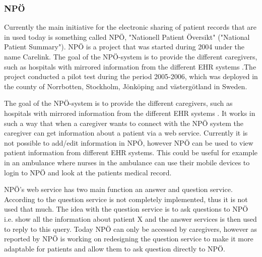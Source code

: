 \documentclass[14pt]{article}
\begin{document}
\subsubsection{NPÖ} %
Currently the main initiative for the electronic sharing of patient records that are in used today is something called NPÖ, "Nationell Patient Översikt" ("National Patient Summary"). NPÖ is a project that was started during 2004 under the name Carelink\cite{ViktorJernelov}. The goal of the NPÖ-system is to provide the different caregivers, such as hospitals with mirrored information from the different \gls{EHR} systems \cite{ViktorJernelov}.The project conducted a pilot test during the period 2005-2006, which was deployed in the county of Norrbotten, Stockholm, Jönköping and västergötland in Sweden.

The goal of the NPÖ-system is to provide the different caregivers, such as hospitals with mirrored information from the different \gls{EHR} systems \cite{ViktorJernelov}. It works in such a way that when a caregiver wants to connect with the NPÖ system the caregiver can get information about a patient via a web service. Currently it is not possible to add/edit information in NPÖ, however NPÖ can be used to view patient information from different \gls{EHR} systems. This could be useful for example in an ambulance where nurses in the ambulance can use their mobile devices to login to NPÖ and look at the patients medical record.  

NPÖ's web service has two main function an answer and question service. According to \cite{ViktorJernelov} the question service is not completely implemented, thus it is not used that much. The idea with the question service is to ask questions to NPÖ i.e. show all the information about patient X and the answer services is then used to reply to this query. Today NPÖ can only be accessed by caregivers, however as reported by \cite{ViktorJernelov} NPÖ is working on redesigning the question service to make it more adaptable for patients and allow them to ask question directly to NPÖ. 
\end{document}
